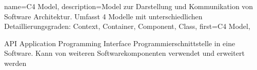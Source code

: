 
{
	name={C4 Model},
	description={Model zur Darstellung und Kommunikation von Software Architektur. Umfasst 4 Modelle mit unterschiedlichen Detaillierungsgraden: Context, Container, Component, Class},
	first={C4 Model},
}


{API}            				%
{Application Programming Interface}  	%
{Programmierschnittstelle in eine Software. Kann von weiteren Softwarekomponenten verwendet und erweitert werden} %

